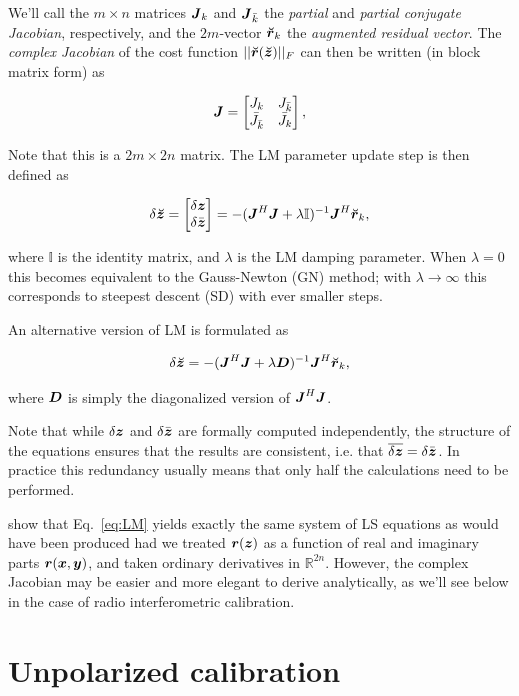 \documentclass[useAMS,usenatbib]{mn2e}
\newcommand{\REAL}{\mathbb{R}}
\newcommand{\II}{\mathbb{I}}
\newcommand{\zz}{\bmath{z}}
\newcommand{\rr}{\bmath{r}}
\newcommand{\mat}[1]{{\bmath{#1}}}
\newcommand{\JJ}{\mat{J}} %
\newcommand{\DD}{\mat{D}}
\begin{document}
We'll call the $m\times n$ matrices $\JJ_k$ and $\JJ_{\bar{k}}$ the \emph{partial} and \emph{partial conjugate Jacobian}, respectively, 
and the $2m$-vector $\Rr_k$ the \emph{augmented residual vector}. The \emph{complex Jacobian} 
of the cost function $||\Rr(\Zz)||_F$ can then be written (in block matrix form) as

\begin{equation}
\label{eq:JJ}
\JJ = \Matrix{cc}{J_k & J_{\bar{k}} \\ \bar{J}_{\bar{k}} & \bar{J}_k },
\end{equation}

Note that this is a $2m \times 2n$ matrix. The LM parameter update step is then defined as

\begin{equation}
\label{eq:LM}
\delta\Zz = \Matrix{c}{\delta \zz \\ \delta \bar{\zz}} = -(\JJ^H \JJ + \lambda\II)^{-1}\JJ^H \Rr_k,
\end{equation}

where $\II$ is the identity matrix, and $\lambda$ is the LM damping parameter. When $\lambda=0$ this becomes 
equivalent to the Gauss-Newton (GN) method; with $\lambda\to\infty$ this corresponds to steepest descent (SD) with ever smaller steps.

An alternative version of LM is formulated as

\begin{equation}
\label{eq:LM1}
\delta\Zz = -(\JJ^H \JJ + \lambda \DD)^{-1}\JJ^H \Rr_k,
\end{equation}

where $\DD$ is simply the diagonalized version of $\JJ^H\JJ$.

Note that while $\delta\zz$ and $\delta \bar{\zz}$ are formally computed independently, the structure of the equations 
ensures that the results are consistent, i.e. that $\overline{\delta\zz} = \delta \bar{\zz}$. In practice this 
redundancy usually means that only half the calculations need to be performed.

\citet{ComplexOpt} show that Eq.~\ref{eq:LM} yields exactly the same system of LS equations as would have 
been produced had we treated $\rr(\zz)$ as a function of real and imaginary parts 
$\rr(\bmath{x},\bmath{y})$, and taken ordinary derivatives in 
$\REAL^{2n}$. However, the complex Jacobian may be easier and more elegant 
to derive analytically, as we'll see below in the case of radio interferometric calibration.

\section{Unpolarized calibration}
\label{sec:unpol}
\end{document}
